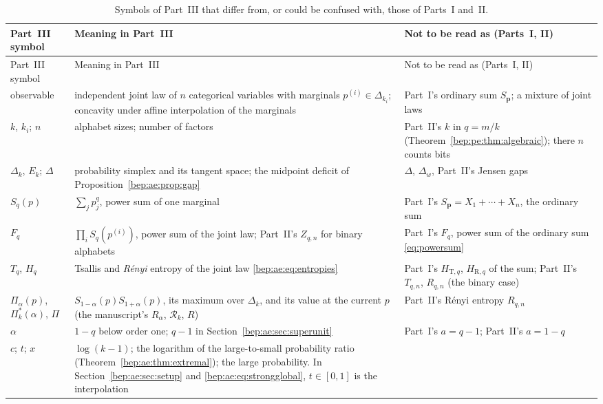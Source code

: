 \documentclass[11pt]{article}
\numberwithin{equation}{section}
\theoremstyle{definition}
\theoremstyle{remark}
\newcommand{\HR}{H_{\mathrm R,q}}
\newcommand{\HT}{H_{\mathrm T,q}}
\begin{document}
\begingroup\small
\setlength{\tabcolsep}{4pt}
\begin{longtable}{@{}>{\raggedright\arraybackslash}p{}
 >{\raggedright\arraybackslash}p{}
 >{\raggedright\arraybackslash}p{}@{}}
\caption{Symbols of Part~III that differ from, or could be confused with,
those of Parts~I and~II.}\label{bep:ae:tab:notation}\\
\toprule
Part~III symbol & Meaning in Part~III & Not to be read as (Parts~I, II)\\
\midrule\endfirsthead
\toprule
Part~III symbol & Meaning in Part~III & Not to be read as (Parts~I, II)\\
\midrule\endhead
observable & independent joint law of $n$ categorical variables with
 marginals $p^{(i)}\in\Delta_{k_i}$; concavity under affine
 interpolation of the marginals & Part~I's ordinary sum
 $S_{\boldsymbol p}$; a mixture of joint laws\\
$k$, $k_i$; $n$ & alphabet sizes; number of factors & Part~II's $k$ in
 $q=m/k$ (Theorem~\ref{bep:pe:thm:algebraic}); there $n$ counts bits\\
$\Delta_k$, $E_k$; $\Delta$ & probability simplex and its tangent space;
 the midpoint deficit of Proposition~\ref{bep:ae:prop:gap} & $\Delta$,
 $\Delta_w$, Part~II's Jensen gaps\\
$S_q(p)$ & $\sum_jp_j^q$, power sum of one marginal & Part~I's
 $S_{\boldsymbol p}=X_1+\cdots+X_n$, the ordinary sum\\
$F_q$ & $\prod_iS_q(p^{(i)})$, power sum of the joint law; Part~II's
 $Z_{q,n}$ for binary alphabets & Part~I's $F_q$, power sum of the
 ordinary sum \eqref{eq:powersum}\\
$T_q$, $H_q$ & Tsallis and \emph{R\'enyi} entropy of the joint law
 \eqref{bep:ae:eq:entropies} & Part~I's $\HT$, $\HR$ of the sum; Part~II's
 $T_{q,n}$, $R_{q,n}$ (the binary case)\\
$\Pi_\alpha(p)$, $\Pi^{*}_k(\alpha)$, $\Pi$ & $S_{1-\alpha}(p)S_{1+\alpha}(p)$,
 its maximum over $\Delta_k$, and its value at the current $p$
 (the manuscript's $R_\alpha$, $\mathcal R_k$, $R$) & Part~II's
 R\'enyi entropy $R_{q,n}$\\
$\alpha$ & $1-q$ below order one; $q-1$ in
 Section~\ref{bep:ae:sec:superunit} & Part~I's $a=q-1$; Part~II's
 $a=1-q$\\
$c$; $t$; $x$ & $\log(k-1)$; the logarithm of the large-to-small
 probability ratio (Theorem~\ref{bep:ae:thm:extremal}); the large
 probability. In Section~\ref{bep:ae:sec:setup} and
 \eqref{bep:ae:eq:strongglobal}, $t\in[0,1]$ is the interpolation

\end{longtable}
\end{document}

